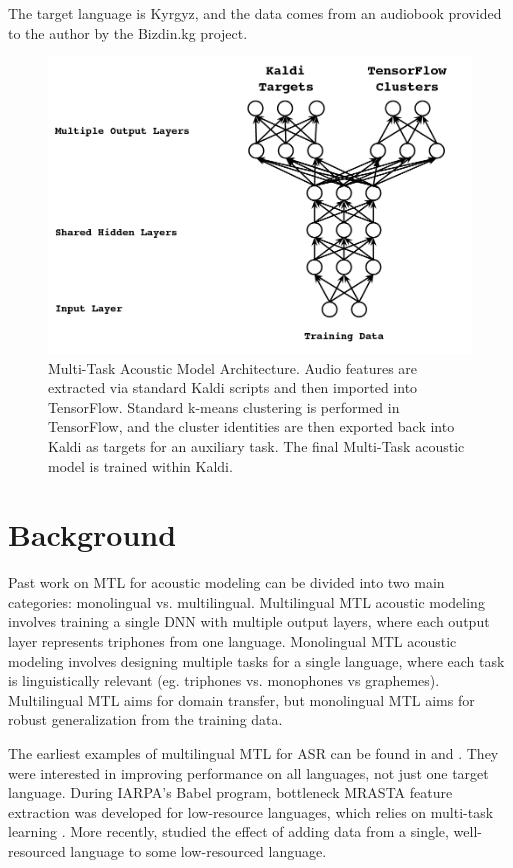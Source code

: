 \documentclass[a4paper]{article}
\begin{document}
The target language is Kyrgyz, and the data comes from an audiobook provided to the author by the Bizdin.kg project.

\begin{figure}[!htbp]
  \centering
{}
  \includegraphics[width=\linewidth]{figs/heigold-2013-dnn-c.png}
  \caption{Multi-Task Acoustic Model Architecture. Audio features are extracted via standard Kaldi scripts and then imported into TensorFlow. Standard k-means clustering is performed in TensorFlow, and the cluster identities are then exported back into Kaldi as targets for an auxiliary task. The final Multi-Task acoustic model is trained within Kaldi.}
    \label{fig:mtl-dnn}
  \endminipage\hfill
\end{figure}


\section{Background}

Past work on MTL for acoustic modeling can be divided into two main categories: monolingual vs. multilingual. Multilingual MTL acoustic modeling involves training a single DNN with multiple output layers, where each output layer represents triphones from one language. Monolingual MTL acoustic modeling involves designing multiple tasks for a single language, where each task is linguistically relevant (eg. triphones vs. monophones vs graphemes). Multilingual MTL aims for domain transfer, but monolingual MTL aims for robust generalization from the training data.

The earliest examples of multilingual MTL for ASR can be found in \cite{huang2013} and \cite{heigold2013}. They were interested in improving performance on all languages, not just one target language. During IARPA's Babel program, bottleneck MRASTA feature extraction was developed for low-resource languages, which relies on multi-task learning \cite{tuske2014multilingual}. More recently, \cite{grezl2016} studied the effect of adding data from a single, well-resourced language to some low-resourced language.
\end{document}
